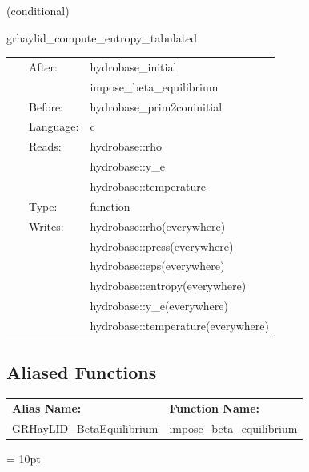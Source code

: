 \vspace{5mm}

   (conditional) 

\hspace{5mm} grhaylid\_compute\_entropy\_tabulated 

\hspace{5mm}{\it computes entropy from density, y\_e, and temperature using tabulated eos } 


\hspace{5mm}

 \begin{tabular*}{160mm}{cll} 
~ & After:  & hydrobase\_initial \\ 
~& ~ &impose\_beta\_equilibrium\\ 
~ & Before:  & hydrobase\_prim2coninitial \\ 
~ & Language:  & c \\ 
~ & Reads:  & hydrobase::rho \\ 
~& ~ &hydrobase::y\_e\\ 
~& ~ &hydrobase::temperature\\ 
~ & Type:  & function \\ 
~ & Writes:  & hydrobase::rho(everywhere) \\ 
~& ~ &hydrobase::press(everywhere)\\ 
~& ~ &hydrobase::eps(everywhere)\\ 
~& ~ &hydrobase::entropy(everywhere)\\ 
~& ~ &hydrobase::y\_e(everywhere)\\ 
~& ~ &hydrobase::temperature(everywhere)\\ 
\end{tabular*} 


\subsection*{Aliased Functions}

\hspace{5mm}

 \begin{tabular*}{160mm}{ll} 

{\bf Alias Name:} ~~~~~~~ & {\bf Function Name:} \\ 
GRHayLID\_BetaEquilibrium & impose\_beta\_equilibrium \\ 
\end{tabular*} 



\vspace{5mm}\parskip = 10pt 
